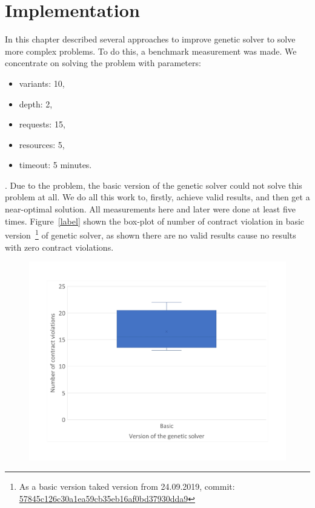 \chapter{Implementation}\label{chapter:Implementation}
In this chapter described several approaches to improve genetic solver to solve more complex problems.
To do this, a benchmark measurement was made.
We concentrate on solving the problem with parameters:
\begin{itemize}
	\item variants: 10,
	\item depth: 2,
	\item requests: 15,
	\item resources: 5,
	\item timeout: 5 minutes.
\end{itemize}.
Due to the problem, the basic version of the genetic solver could not solve this problem at all. We do all this work to, firstly, achieve valid results, and then get a near-optimal solution. 
All measurements here and later were done at least five times. 
Figure~\ref{label} shown the box-plot of number of contract violation in basic version~\footnote{As a basic version taked version from 24.09.2019, commit: \href{https://git-st.inf.tu-dresden.de/mquat/mquat2/commit/57845c126c30a1ea59cb35eb16af0bd37930dda9}{57845c126c30a1ea59cb35eb16af0bd37930dda9}} of genetic solver, as shown there are no valid results cause no results with zero contract violations.

\begin{figure}
	\centering
	\includegraphics[width=\textwidth]{images/BoxPlotSolverBasic}
	\caption[Boxplot with a number of contract violations for the basic version of genetic solver]{}
	\label{fig:boxplotsolverbasic}
\end{figure}


